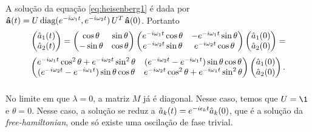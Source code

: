 \documentclass[a4paper,fleqn,12pt]{article}
\begin{document}
\subsubsection{} \label{sec:sol-nonint}

A solução da equação \ref{eq:heisenberg1} é dada por $\vb{\hat{a}}(t) = U \, \text{diag}(e^{-i\omega_1 t}, e^{-i\omega_2 t}) \, U^T \, \vb{\hat{a}}(0)$. Portanto
$$
\begin{pmatrix}
\hat{a}_1(t) \\ \hat{a}_2(t)
\end{pmatrix} =
\begin{pmatrix}
\cos \theta & \sin \theta \\
-\sin\theta & \cos\theta
\end{pmatrix}
\begin{pmatrix}
e^{-i\omega_1 t} \cos\theta & -e^{-i\omega_1 t}\sin\theta \\
e^{-i\omega_2 t} \sin\theta & e^{-i\omega_2 t}\cos\theta
\end{pmatrix}
\begin{pmatrix}
\hat{a}_1(0) \\ \hat{a}_2(0)
\end{pmatrix} =
$$
$$
\begin{pmatrix}
e^{-i\omega_1 t} \cos^2\theta + e^{-i\omega_2 t}\sin^2\theta & (e^{-i\omega_2 t} - e^{-i\omega_1 t}) \sin\theta \cos\theta \\
(e^{-i\omega_2 t} - e^{-i\omega_1 t}) \sin\theta \cos\theta & e^{-i\omega_2 t} \cos^2\theta + e^{-i\omega_1 t}\sin^2\theta
\end{pmatrix}
\begin{pmatrix}
\hat{a}_1(0) \\ \hat{a}_2(0)
\end{pmatrix}.
$$

\subsubsection{}

No limite em que $\lambda = 0$, a matriz $M$ já é diagonal. Nesse caso, temos que $U = \1$ e $\theta = 0$. Nesse caso, a solução se reduz a $\hat{a}_k(t) = e^{-i\epsilon_k t} \hat{a}_k(0)$, que é a solução da \textit{free-hamiltonian}, onde só existe uma oscilação de fase trivial.

\subsubsection{}
\end{document}
